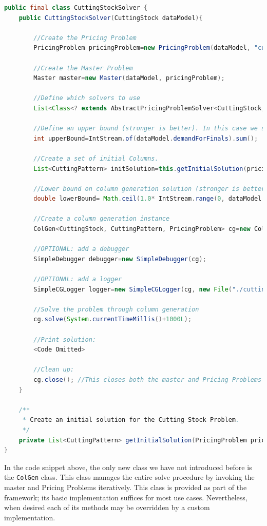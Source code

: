 \documentclass[a4paper]{article}
\newenvironment{myblock}[1]{%
    \tcolorbox[beamer,%
    noparskip,breakable,
    colback=lightBlueCodeBlock,colframe=darkBlueCodeBlock,%
    colbacklower=darkBlueCodeBlock!75!lightBlueCodeBlock,%
    coltitle=blueTitleCodeBlock,
    title=#1]}%
    {\endtcolorbox}
\newcommand{\code}[1]{\lstinline[language=java, style=seminar]!#1!}
\begin{document}
\begin{myblock}{CuttingStockSolver}
\begin{lstlisting}[language=java, style=eclipseArticle, xleftmargin=2em]  
public final class CuttingStockSolver {
	public CuttingStockSolver(CuttingStock dataModel){

		//Create the Pricing Problem
		PricingProblem pricingProblem=new PricingProblem(dataModel, "cuttingStockPricing");

		//Create the Master Problem
		Master master=new Master(dataModel, pricingProblem);

		//Define which solvers to use
		List<Class<? extends AbstractPricingProblemSolver<CuttingStock, CuttingPattern, PricingProblem>>> solvers= Collections.singletonList(ExactPricingProblemSolver.class);

		//Define an upper bound (stronger is better). In this case we simply sum the demands, i.e. cut each final from its own raw (Rather poor initial solution).
		int upperBound=IntStream.of(dataModel.demandForFinals).sum();

		//Create a set of initial Columns.
		List<CuttingPattern> initSolution=this.getInitialSolution(pricingProblem);

		//Lower bound on column generation solution (stronger is better): calculate least amount of finals needed to fulfil the order (ceil(\sum_j d_j*w_j /L) 
		double lowerBound= Math.ceil(1.0* IntStream.range(0, dataModel.nrFinals).mapToObj(i -> dataModel.demandForFinals[i] * dataModel.finals[i]).mapToInt(i -> i).sum() / dataModel.rollWidth);

		//Create a column generation instance
		ColGen<CuttingStock, CuttingPattern, PricingProblem> cg=new ColGen<>(dataModel, master, pricingProblem, solvers, initSolution, upperBound, lowerBound);

		//OPTIONAL: add a debugger
		SimpleDebugger debugger=new SimpleDebugger(cg);

		//OPTIONAL: add a logger
		SimpleCGLogger logger=new SimpleCGLogger(cg, new File("./cuttingStock.log"));

		//Solve the problem through column generation
		cg.solve(System.currentTimeMillis()+1000L);

		//Print solution:
		<Code Omitted>
		
		//Clean up:
		cg.close(); //This closes both the master and Pricing Problems
	}
	
	/**
	 * Create an initial solution for the Cutting Stock Problem.
	 */
	private List<CuttingPattern> getInitialSolution(PricingProblem pricingProblem){<Code Omitted>}
}
\end{lstlisting}
\end{myblock}
In the code snippet above, the only new class we have not introduced before is the \code{ColGen} class. This class manages the entire solve procedure by invoking the master and Pricing Problems iteratively. This class is provided as part of the framework; its basic implementation suffices for most use cases. Nevertheless, when desired each of its methods may be overridden by a custom implementation.
\end{document}
